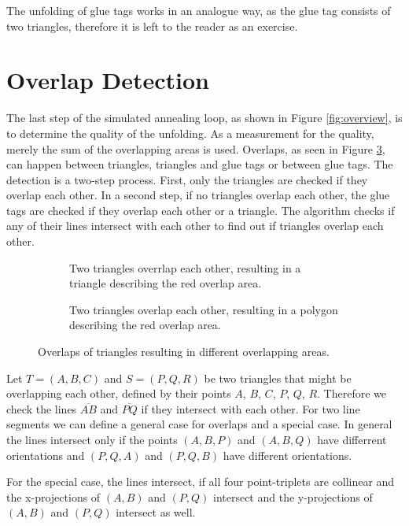 \documentclass[draft,final]{vutinfth} %
\begin{document}
The unfolding of glue tags works in an analogue way, as the glue tag consists of two triangles, therefore it is left to the reader as an exercise.

\section{Overlap Detection}

The last step of the simulated annealing loop, as shown in Figure \ref{fig:overview}, is to determine the quality of the unfolding. As a measurement for the quality, merely the sum of the overlapping areas is used. Overlaps, as seen in Figure \ref{fig:overlap}, can happen between triangles, triangles and glue tags or between glue tags. The detection is a two-step process. First, only the triangles are checked if they overlap each other. In a second step, if no triangles overlap each other, the glue tags are checked if they overlap each other or a triangle. The algorithm checks if any of their lines intersect with each other to find out if triangles overlap each other.

\begin{figure}
\centering
\begin{subfigure}[t]{.5\textwidth}
	
  \caption{Two triangles overrlap each other, resulting in a triangle describing the red overlap area.}
	\label{fig:overlap1}
\end{subfigure}%
\begin{subfigure}[t]{.5\textwidth}
	
	\caption{Two triangles overlap each other, resulting in a polygon describing the red overlap area.}
	\label{fig:overlap2}
\end{subfigure}
\caption{Overlaps of triangles resulting in different overlapping areas.}
\label{fig:overlap}
\end{figure}

Let $T = (A,B,C)$ and $S = (P,Q,R)$ be two triangles that might be overlapping each other, defined by their points $A$, $B$, $C$, $P$, $Q$, $R$. Therefore we check the lines $\overline{AB}$ and $\overline{PQ}$ if they intersect with each other. For two line segments we can define a general case for overlaps and a special case. In general the lines intersect only if the points $(A,B,P)$ and $(A,B,Q)$ have differrent orientations and $(P,Q,A)$ and $(P,Q,B)$ have different orientations.

For the special case, the lines intersect, if all four point-triplets are collinear and the x-projections of $(A,B)$ and $(P,Q)$ intersect and the y-projections of $(A,B)$ and $(P,Q)$ intersect as well.
\end{document}
